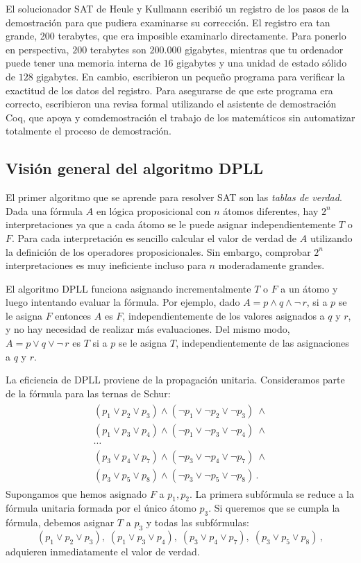 El solucionador SAT de Heule y Kullmann escribió un registro de los pasos de la demostración para que pudiera examinarse su corrección. El registro era tan grande, 200 terabytes, que era imposible examinarlo directamente. Para ponerlo en perspectiva, $200$ terabytes son $200.000$ gigabytes, mientras que tu ordenador puede tener una memoria interna de $16$ gigabytes y una unidad de estado sólido de $128$ gigabytes. En cambio, escribieron un pequeño programa para verificar la exactitud de los datos del registro. Para asegurarse de que este programa era correcto, escribieron una revisa formal utilizando el asistente de demostración Coq, que apoya y comdemostración el trabajo de los matemáticos sin automatizar totalmente el proceso de demostración.

\subsection{Visión general del algoritmo DPLL}

El primer algoritmo que se aprende para resolver SAT son las \emph{tablas de verdad}. Dada una fórmula $A$ en lógica proposicional con $n$ átomos diferentes, hay $2^n$ interpretaciones ya que a cada átomo se le puede asignar independientemente $T$ o $F$. Para cada interpretación es sencillo calcular el valor de verdad de $A$ utilizando la definición de los operadores proposicionales. Sin embargo, comprobar $2^n$ interpretaciones es muy ineficiente incluso para $n$ moderadamente grandes.

El algoritmo DPLL funciona asignando incrementalmente $T$ o $F$ a un átomo y luego intentando evaluar la fórmula. Por ejemplo, dado $A=p \wedge q \wedge \neg\, r$, si a $p$ se le asigna $F$ entonces $A$ es $F$, independientemente de los valores asignados a $q$ y $r$, y no hay necesidad de realizar más evaluaciones. Del mismo modo, $A=p\vee q \vee \neg\, r$ es $T$ si a $p$ se le asigna $T$, independientemente de las asignaciones a $q$ y $r$.

La eficiencia de DPLL proviene de la propagación unitaria. Consideramos parte de la fórmula para las ternas de Schur:
\begin{align}
\begin{array}{l}\label{eq.schur3}
(p_1 \vee p_2 \vee p_3) \wedge (\neg p_1 \vee \neg p_2 \vee \neg p_3) \:\wedge \\
(p_1 \vee p_3 \vee p_4) \wedge (\neg p_1 \vee \neg p_3 \vee \neg p_4) \:\wedge \\
\cdots\\
(p_3 \vee p_4 \vee p_7) \wedge (\neg p_3 \vee \neg p_4 \vee \neg p_7) \:\wedge \\
(p_3 \vee p_5 \vee p_8) \wedge (\neg p_3 \vee \neg p_5 \vee \neg p_8)\,.
\end{array}
\end{align}
Supongamos que hemos asignado $F$ a $p_1,p_2$. La primera subfórmula se reduce a la fórmula unitaria formada por el único átomo $p_3$. Si queremos que se cumpla la fórmula, debemos asignar $T$ a $p_3$ y todas las subfórmulas:
\[
(p_1 \vee p_2 \vee p_3),\;(p_1 \vee p_3 \vee p_4),\;
(p_3 \vee p_4 \vee p_7),\;(p_3 \vee p_5 \vee p_8)\,,
\]
adquieren inmediatamente el valor de verdad.

